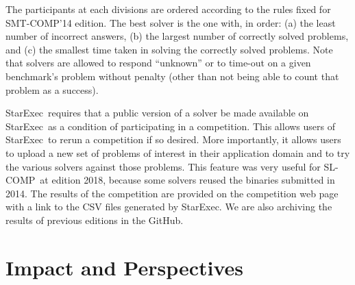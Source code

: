 \documentclass[orivec]{llncs}
\newcommand{\smtcomp}{\textsf{SMT-COMP}}
\newcommand{\slcomp}{\textsf{SL-COMP}}
\newcommand{\starexec}{\textsf{StarExec}}
\begin{document}
The participants at each divisions are ordered according to the rules 
fixed for \smtcomp'14 edition. 
The best solver is the one with, in order:
(a) the least number of incorrect answers, 
(b) the largest number of correctly solved problems, and 
(c) the smallest time taken in solving the correctly solved problems.
%
Note that solvers are allowed to respond ``unknown'' or to time-out on a given benchmark's problem without penalty (other than not being able to count that problem as a success).


\starexec\ requires that a public version of a solver be made available on \starexec\ as a condition of participating in a competition. This allows users of \starexec\ to rerun a competition if so desired. More importantly, it allows users to upload a new set of problems of interest in their application domain and to try the various solvers against those problems.
This feature was very useful for \slcomp\ at edition 2018, because some
solvers reused the binaries submitted in 2014. 
%
The results of the competition are provided on the competition web page with a 
link to the CSV files generated by \starexec. We are also archiving the results of
previous editions in the GitHub.



\section{Impact and Perspectives}
\label{sec:impact}
\end{document}
